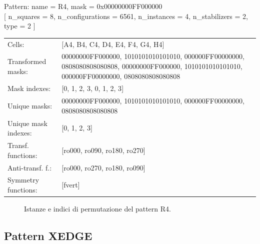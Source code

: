 \begin{tcolorbox}[sharp corners, fontupper=\ttfamily\small, colback=white]
  \noindent Pattern: name = R4, mask = 0x00000000FF000000\\
  {[} n\_squares = 8, n\_configurations = 6561,
  n\_instances = 4, n\_stabilizers = 2, type = 2 { ]}\\[1.0ex]
  \begin{tabularx}{\textwidth}{@{} p{3.5cm} X @{}}
    Cells:               & {[}A4, B4, C4, D4, E4, F4, G4, H4{]}\\[0.5ex]
    Transformed masks:   & 00000000FF000000, 1010101010101010, 000000FF00000000, 0808080808080808, 00000000FF000000, 1010101010101010, 000000FF00000000, 0808080808080808\\[0.5ex]
    Mask indexes:        & {[}0, 1, 2, 3, 0, 1, 2, 3{]}\\[0.5ex]
    Unique masks:        & 00000000FF000000, 1010101010101010, 000000FF00000000, 0808080808080808\\[0.5ex]
    Unique mask indexes: & {[}0, 1, 2, 3{]}\\[0.5ex]
    Transf. functions:   & {[}ro000, ro090, ro180, ro270{]}\\[0.5ex]
    Anti-transf. f.:     & {[}ro000, ro270, ro180, ro090{]}\\[0.5ex]
    Symmetry functions:  & {[}fvert{]}\\[0.5ex]
  \end{tabularx}
\end{tcolorbox}

\begin{figure}[htbp]
  \centering
   \hfill
   \hfill
   \hfill
  \vspace{0.3cm}
   \hfill
   \hfill
   \hfill
  \caption{Istanze e indici di permutazione del pattern R4.}
\end{figure}

\newpage

\subsection{Pattern XEDGE}

